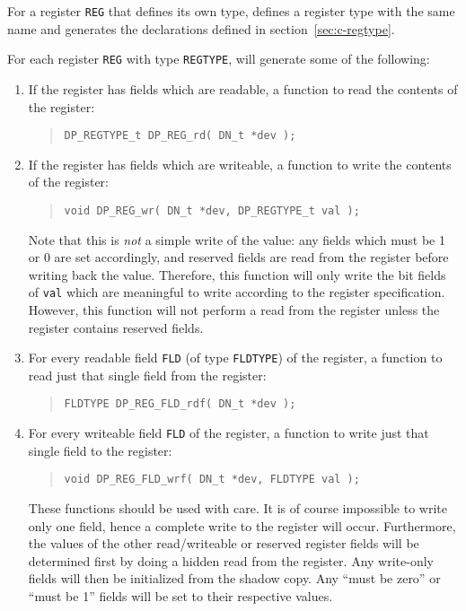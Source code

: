 \documentclass[a4paper,11pt,twoside]{report}
\begin{document}
For a register \texttt{REG} that defines its own type, \Mac defines
a register type with the same name and generates the declarations
defined in section~\ref{sec:c-regtype}. 

For each register \texttt{REG} with type \texttt{REGTYPE}, \Mac will
generate some of the following:

\begin{enumerate}

\item If the register has fields which are readable, a function to
  read the contents of the register:
  \begin{quote}
    \texttt{DP\_REGTYPE\_t DP\_REG\_rd( DN\_t *dev );}
  \end{quote}

\item If the register has fields which are writeable, a function to
  write the contents of the register:
  \begin{quote}
    \texttt{void DP\_REG\_wr( DN\_t *dev, DP\_REGTYPE\_t val );}
  \end{quote}
  Note that this is \emph{not} a simple write of the value: any fields
  which must be 1 or 0 are set accordingly, and reserved fields are
  read from the register before writing back the value.  Therefore,
  this function will only write the bit fields of \texttt{val} which
  are meaningful to write according to the register specification.
  However, this function will not perform a read from the register
  unless the register contains reserved fields. 

\item For every readable field \texttt{FLD} (of type \texttt{FLDTYPE})
  of the register, a function to read just that single field from the
  register: 
  \begin{quote}
    \texttt{FLDTYPE DP\_REG\_FLD\_rdf( DN\_t *dev );}
  \end{quote}

\item For every writeable field \texttt{FLD} of the register, a function to
  write just that single field to the register:
  \begin{quote}
    \texttt{void DP\_REG\_FLD\_wrf( DN\_t *dev, \texttt{FLDTYPE} val );}
  \end{quote}
  
  These functions should be used with care.  It is of
  course impossible to write only one field, hence a complete write to
  the register will occur.  Furthermore, the values of the other
  read/writeable or reserved register fields will be determined first
  by doing a hidden read from the register.   Any write-only 
  fields will then be initialized from the shadow copy.  Any ``must be
  zero'' or ``must be 1'' fields will be set to their respective values.  


\end{enumerate}
\end{document}
